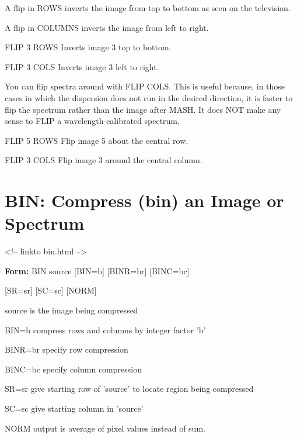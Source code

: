 A flip in ROWS inverts the image from top to bottom as seen on the
television.

A flip in COLUMNS inverts the image from left to right.  

\begin{example}
  \item[FLIP 3 ROWS\hfill]{Inverts image 3 top to bottom.}
  \item[FLIP 3 COLS\hfill]{Inverts image 3 left to right.}
\end{example}
You can flip spectra around with FLIP COLS.  This is useful because, in
those cases in which the dispersion does not run in the desired direction,
it is faster to flip the spectrum rather than the image after MASH.  It
does NOT make any sense to FLIP a wavelength-calibrated spectrum.
\begin{example}
  \item[FLIP 5 ROWS\hfill]{Flip image 5 about the central row.}
  \item[FLIP 3 COLS\hfill]{Flip image 3 around the central column.}
\end{example}

\section{BIN: Compress (bin) an Image or Spectrum}
\begin{rawhtml}
<!-- linkto bin.html -->
\end{rawhtml}

\begin{command}
  \item[\textbf{Form: }BIN source {[BIN=b]} {[BINR=br]} {[BINC=bc]} \hfill]{}
  \item{{[SR=sr]} {[SC=sc]} {[NORM]}}
  \item[source]{is the image being compressed}
  \item[BIN=b]{compress rows and columns by integer factor 'b'}
  \item[BINR=br]{specify row compression}
  \item[BINC=bc]{specify column compression}
  \item[SR=sr]{give starting row of 'source' to locate region
       being compressed}
  \item[SC=sc]{give starting column in 'source'}
  \item[NORM]{output is average of pixel values instead of sum.}
\end{command}

